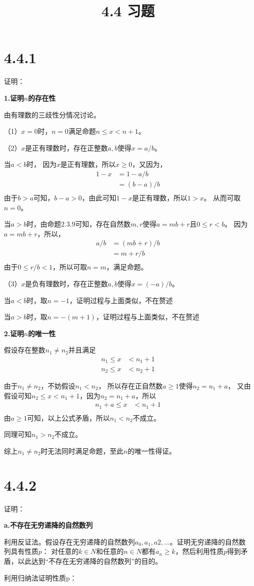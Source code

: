 \documentclass{article}
\theoremstyle{mystyle}
\begin{document}
\title{4.4 习题}
\maketitle

\section*{4.4.1}
证明：

\textbf{1.证明$n$的存在性}

由有理数的三歧性分情况讨论。

（1）$x = 0$时，$n=0$满足命题$n \leq x < n+1$。

（2）$x$是正有理数时，存在正整数$a,b$使得$x = a / b$。

当$a<b$时，
因为$x$是正有理数，所以$x \geq 0$，又因为，
\begin{align*}
  1 - x & = 1 - a/b \\
        & = (b-a)/b \\
\end{align*}
由于$b>a$可知，$b-a>0$，由此可知$1-x$是正有理数，所以$1 > x$。
从而可取$n=0$。

当$a>b$时，由命题$2.3.9$可知，存在自然数$m,r$使得$a=mb+r$且$0 \leq r < b$。
因为$a=mb+r$，所以，
\begin{align*}
  a/b & = (mb + r) / b \\
      & = m + r/b      \\
\end{align*}
由于$0 \leq r/b < 1$，所以可取$n=m$，满足命题。

（3）$x$是负有理数时，存在正整数$a,b$使得$x = (-a) / b$。

当$a<b$时，取$n=-1$，证明过程与上面类似，不在赘述

当$a>b$时，取$n=-(m+1)$，证明过程与上面类似，不在赘述

\textbf{2.证明$n$的唯一性}

假设存在整数$n_1 \neq n_2$并且满足
\begin{align}
  n_1  \leq x & < n_1 + 1 \\
  n_2  \leq x & < n_2 + 1
\end{align}

由于$n_1 \neq n_2$，不妨假设$n_1 < n_2$，
所以存在正自然数$a \geq 1$使得$n_2 = n_1 + a$，
又由假设可知$n_2 \leq x < n_1 + 1$，因为$n_2 = n_1 + a$，所以
\begin{align*}
  n_1 + a  \leq x & < n_1 + 1 \\
\end{align*}
由$a \geq 1$可知，以上公式矛盾，所以$n_1 < n_2$不成立。

同理可知$n_1 > n_2$不成立。

综上$n_1 \neq n_2$时无法同时满足命题，至此$n$的唯一性得证。

\section*{4.4.2}

证明：

\textbf{a.不存在无穷递降的自然数列}

利用反证法。假设存在无穷递降的自然数列$a_0,a_1,a2,...$。证明无穷递降的自然数列具有性质$p$：
对任意的$k \in N$和任意的$n \in N$都有$a_n \geq k$，然后利用性质$p$得到矛盾，以此达到“不存在无穷递降的自然数列”的目的。

利用归纳法证明性质p：
\end{document}
